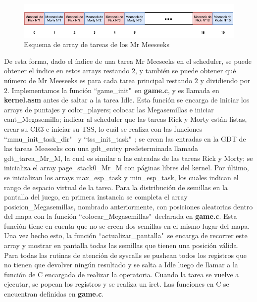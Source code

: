 \documentclass[a4paper]{article}
\begin{document}
\begin{figure}[h]
	\centering
	\includegraphics[scale=1.0]{img/TareasSinRickyMorty.pdf}
	\caption{Esquema de array de tareas de los Mr Meeseeks}
\end{figure}

\justify
De esta forma, dado el índice de una tarea Mr Meeseeks en el scheduler, se puede obtener el índice en estos arrays restando $2$, y también se puede obtener qué número de Mr Meeseeks es para cada tarea principal restando $2$ y dividiendo por $2$.
\justify
Implementamos la función ``game_init"\ en \textbf{game.c}, y es llamada en \textbf{kernel.asm} antes de saltar a la tarea Idle. Esta función se encarga de iniciar los arrays de puntajes y color_players; colocar las Megasemillas e iniciar cant_Megasemilla; indicar al scheduler que las tareas Rick y Morty están listas, crear su CR3 e iniciar su TSS, lo cuál se realiza con las funciones ``mmu_init_task_dir" \ y ``tss_init_task"\ ; se crean las entradas en la GDT de las tareas Meeseeks con una gdt_entry  predeterminada llamada gdt_tarea_Mr_M, la cual es similar a las entradas de las tareas Rick y Morty; se inicializa el array page_stack0_Mr_M con páginas libres del kernel. Por último, se inicializan los arrays max_esp_task y min_esp_task, los cuales indican el rango de espacio virtual de la tarea. 
\justify
Para la distribución de semillas en la pantalla del juego, en primera instancia se completa el array posicion_Megasemillas, nombrado anteriormente, con posiciones aleatorias dentro del mapa con la función ``colocar_Megasemillas"\ declarada en \textbf{game.c}. Esta función tiene en cuenta que no se creen dos semillas en el mismo lugar del mapa. Una vez hecho esto, la función ``actualizar_pantalla"\ se encarga de recorrer este array y mostrar en pantalla todas las semillas que tienen una posición válida.
\justify
Para todas las rutinas de atención de syscalls se pushean todos los registros que no tienen que devolver ningún resultado y se salta a Idle luego de llamar a la función de C encargada de realizar la operatoria. Cuando la tarea se vuelve a ejecutar, se popean los registros y se realiza un iret. Las funciones en C se encuentran definidas en \textbf{game.c}.
\justify
\end{document}
